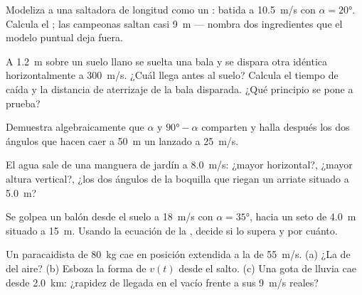 \begin{exercise}[$\star\star$]\label{exo:g12:projectile-motion:9}
Modeliza a una saltadora de longitud como un : batida a \qty{10.5}{m/s} con
$\alpha = \ang{20}$. Calcula el ; las campeonas saltan casi \qty{9}{m} ---
nombra dos ingredientes que el modelo puntual deja fuera.
\end{exercise}

\begin{exercise}[$\star\star$]\label{exo:g12:projectile-motion:10}
A \qty{1.2}{m} sobre un suelo llano se suelta una bala y se dispara otra idéntica
horizontalmente a \qty{300}{m/s}. ¿Cuál llega antes al suelo? Calcula el tiempo de
caída y la distancia de aterrizaje de la bala disparada. ¿Qué principio se pone a
prueba?
\end{exercise}

\begin{exercise}[$\star\star$]\label{exo:g12:projectile-motion:11}
Demuestra algebraicamente que $\alpha$ y $\ang{90} - \alpha$ comparten  y halla
después los dos ángulos que hacen caer a \qty{50}{m} un  lanzado a
\qty{25}{m/s}.
\end{exercise}

\begin{exercise}[$\star\star\star$]\label{exo:g12:projectile-motion:12}
El agua sale de una manguera de jardín a \qty{8.0}{m/s}: ¿mayor  horizontal?,
¿mayor altura vertical?, ¿los dos ángulos de la boquilla que riegan un arriate situado
a \qty{5.0}{m}?
\end{exercise}

\begin{exercise}[$\star\star\star$]\label{exo:g12:projectile-motion:13}
Se golpea un balón desde el suelo a \qty{18}{m/s} con $\alpha = \ang{35}$, hacia un
seto de \qty{4.0}{m} situado a \qty{15}{m}. Usando la ecuación de la ,
decide si lo supera y por cuánto.
\end{exercise}

\begin{exercise}[$\star\star\star$]\label{exo:g12:projectile-motion:14}
Un paracaidista de \qty{80}{kg} cae en posición extendida a la  de
\qty{55}{m/s}. (a) ¿La  de  del aire? (b) Esboza la forma de $v(t)$
desde el salto. (c) Una gota de lluvia cae desde \qty{2.0}{km}: ¿rapidez de llegada en
el vacío frente a sus \qty{9}{m/s} reales?
\end{exercise}

